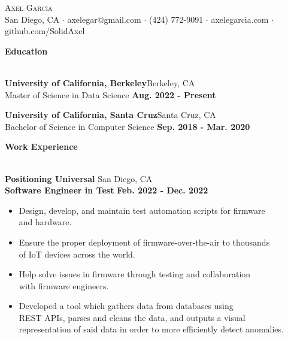 \documentclass[a4paper]{article}
\newcommand{\lineunder} {
    \vspace*{-8pt} \\
    \hspace*{-18pt} \hrulefill \\
}
\newcommand{\header} [1] {
    {\hspace*{-18pt}\vspace*{6pt}\LARGE \textbf{#1}}
    \vspace*{-6pt} \lineunder
}
\begin{document}
\vspace*{-40pt}

    

\vspace*{-10pt}
\begin{center}
	{\Huge \scshape {Axel Garcia}}\\[2mm]
	San Diego, CA $\cdot$ axelegar@gmail.com $\cdot$ (424) 772-9091 $\cdot$ axelegarcia.com $\cdot$ github.com/SolidAxel\\
\end{center}

\header{Education}
\vspace{1mm}

\textbf{University of California, Berkeley}\hfill Berkeley, CA\\
\quad Master of Science in Data Science \hfill \textbf{Aug. 2022 - Present}\\
\vspace{2mm}

\textbf{University of California, Santa Cruz}\hfill Santa Cruz, CA\\
\quad Bachelor of Science in Computer Science \hfill \textbf{Sep. 2018 - Mar. 2020}\\
\vspace{2mm}

\header{Work Experience}
\vspace{1mm}

\textbf{Positioning Universal} \hfill San Diego, CA\\
\hspace{4mm} \textbf{Software Engineer in Test} \hfill \textbf{Feb. 2022 - Dec. 2022}\\
\vspace{-2mm}
\begin{itemize} \itemsep -2pt
	\item Design, develop, and maintain test automation scripts for firmware\\ and hardware.
	\item Ensure the proper deployment of firmware-over-the-air to thousands \\of IoT devices across the world.
	\item Help solve issues in firmware through testing and collaboration\\ with firmware engineers.
	\item Developed a tool which gathers data from databases using\\ REST APIs, parses and cleans the data, and outputs a visual\\ representation of said data in order to more efficiently detect anomalies.
\end{itemize}
\end{document}
